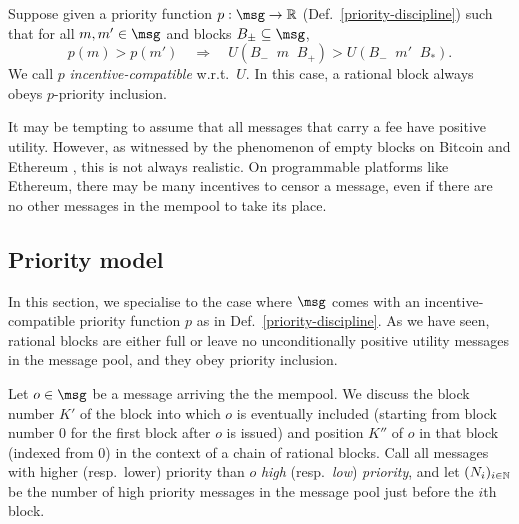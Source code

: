\documentclass[a4paper,11pt]{article}
\newcommand \cat {\mathop{|\!|}}
\begin{document}
\begin{example}
\label{priority-inclusion-rational}

  Suppose given a priority function $p:\msg\rightarrow\R$ (Def.~\ref{priority-discipline}) such that for all $m,m'\in\msg$ and blocks $B_\pm\subseteq\msg$,
  \[
    p(m) > p(m') \quad \Rightarrow \quad U(B_-\cat m\cat B_+) > U(B_-\cat m'\cat B_*).
  \]
  We call $p$ \emph{incentive-compatible} w.r.t.~$U$.
  In this case, a rational block always obeys $p$-priority inclusion.

\end{example}

\begin{remark}
  
  It may be tempting to assume that all messages that carry a fee have positive utility.
  However, as witnessed by the phenomenon of empty blocks on Bitcoin and Ethereum \cite{gauthier2016why,silva2020impact}, this is not always realistic.
  On programmable platforms like Ethereum, there may be many incentives to censor a message, even if there are no other messages in the mempool to take its place.

\end{remark}


\subsection{Priority model}
\label{priority-model}

In this section, we specialise to the case where $\msg$ comes with an incentive-compatible priority function $p$ as in Def.~\ref{priority-discipline}.
%
As we have seen, rational blocks are either full or leave no unconditionally positive utility messages in the message pool, and they obey priority inclusion.

Let $o\in\msg$ be a message arriving the the mempool. We discuss the block number $K'$ of the block into which $o$ is eventually included (starting from block number $0$ for the first block after $o$ is issued) and position $K''$ of $o$ in that block (indexed from $0$) in the context of a chain of rational blocks.
%
Call all messages with higher (resp.~lower) priority than $o$ \emph{high} (resp.~\emph{low}) \emph{priority}, and let $(N_{i})_{i\in\mathbb N}$ be the number of high priority messages in the message pool just before the $i$th block.
\end{document}
